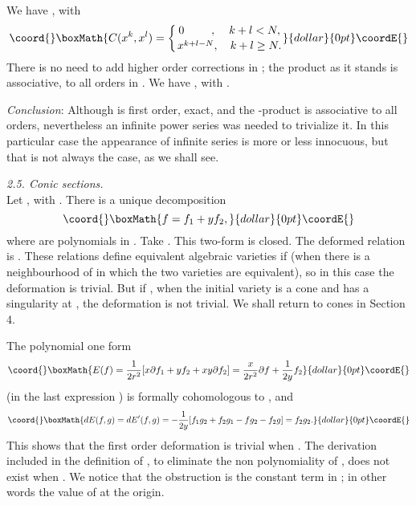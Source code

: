 \documentclass[a4paper,a4paper]{article}
\begin{document}
We have \coordHE{}, with
 $$\coord{}\boxMath{
C(x^k,x^l) =  \biggl\{ {0 \hskip8.5mm,\hskip4mm k+l < N,\atop
  x^{k+l-N} , \quad k+l \geq N.}
}{dollar}{0pt}\coordE{}$$
There is no need to add higher order corrections in \coordHE{}; the product
as it stands is associative,  to all orders in \myHighlight{$\lambda$}\coordHE{}.  We have \coordHE{},
with \coordHE{}.
\vspace*{1mm}

\noindent\textit{Conclusion}: Although \coordHE{} is  first order, exact,  
and the \myHighlight{$*$}\coordHE{}-product is associative to all orders, nevertheless an
infinite power series was needed to trivialize it.  
In this particular case the appearance of infinite series is more or 
less innocuous, but that is not always the case, as we shall see.  
 
\smallskip

\noindent\textit{2.5. Conic sections.} \\
Let \coordHE{}, with \coordHE{}. 
There is a unique decomposition 
$$\coord{}\boxMath{f = f_1 + yf_2,}{dollar}{0pt}\coordE{}$$
where \coordHE{} are polynomials in \coordHE{}. Take \coordHE{}. This 
two-form is closed. The deformed relation is \coordHE{}. 
These relations define equivalent algebraic varieties if \coordHE{}
(when \coordHE{} there is a neighbourhood of \coordHE{} 
in which the two varieties are equivalent), 
so in this case the deformation is trivial. But if \coordHE{}, when the 
initial variety is a cone and has a singularity at
\coordHE{}, the deformation is not trivial. 
We shall return to cones in Section 4.

The polynomial one form
$$\coord{}\boxMath{
E(f) = \frac{1}{2r^2}[x\partial f_1 + yf_2 + xy\partial f_2]  =
\frac{x}{2r^2}\partial f + \frac{1}{2y}f_2 
}{dollar}{0pt}\coordE{}$$ 
(in the last expression \coordHE{}) is formally cohomologous to
\coordHE{}, and
$$\coord{}\boxMath{
dE(f,g) = dE'(f,g) = -\frac{1}{2y}[f_1g_2 + f_2g_1 - fg_2 - f_2g]
= f_2g_2.
}{dollar}{0pt}\coordE{}$$  
This   shows that the first order deformation is trivial when \coordHE{}. 
The derivation included in the definition of \coordHE{}, to eliminate the
non polynomiality of \coordHE{}, does not exist when \coordHE{}.  We notice
that the obstruction is the constant term in \coordHE{}; in other words the
value of \coordHE{} at the origin.
 
\end{document}
